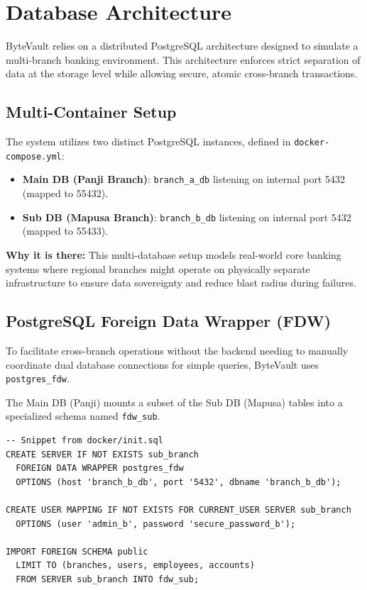 \section{Database Architecture}

ByteVault relies on a distributed PostgreSQL architecture designed to simulate a multi-branch banking environment. This architecture enforces strict separation of data at the storage level while allowing secure, atomic cross-branch transactions.

\subsection{Multi-Container Setup}
The system utilizes two distinct PostgreSQL instances, defined in \texttt{docker-compose.yml}:
\begin{itemize}
  \item \textbf{Main DB (Panji Branch)}: \texttt{branch\_a\_db} listening on internal port 5432 (mapped to 55432).
  \item \textbf{Sub DB (Mapusa Branch)}: \texttt{branch\_b\_db} listening on internal port 5432 (mapped to 55433).
\end{itemize}

\textbf{Why it is there:} This multi-database setup models real-world core banking systems where regional branches might operate on physically separate infrastructure to ensure data sovereignty and reduce blast radius during failures.

\subsection{PostgreSQL Foreign Data Wrapper (FDW)}
To facilitate cross-branch operations without the backend needing to manually coordinate dual database connections for simple queries, ByteVault uses \texttt{postgres\_fdw}. 

The Main DB (Panji) mounts a subset of the Sub DB (Mapusa) tables into a specialized schema named \texttt{fdw\_sub}.

\begin{lstlisting}[style=sql]
-- Snippet from docker/init.sql
CREATE SERVER IF NOT EXISTS sub_branch
  FOREIGN DATA WRAPPER postgres_fdw
  OPTIONS (host 'branch_b_db', port '5432', dbname 'branch_b_db');

CREATE USER MAPPING IF NOT EXISTS FOR CURRENT_USER SERVER sub_branch
  OPTIONS (user 'admin_b', password 'secure_password_b');

IMPORT FOREIGN SCHEMA public
  LIMIT TO (branches, users, employees, accounts)
  FROM SERVER sub_branch INTO fdw_sub;
\end{lstlisting}

